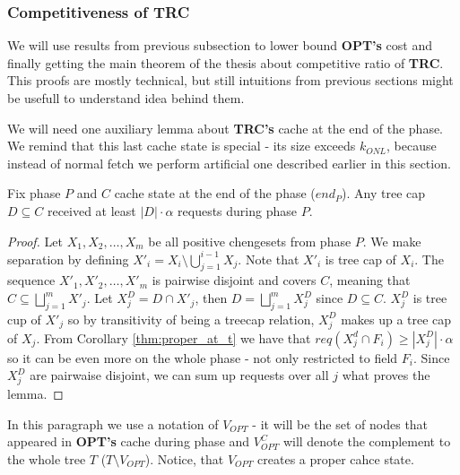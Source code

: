 \subsubsection{Competitiveness of TRC}
We will use results from previous subsection to lower bound \textbf{OPT's} cost 
and finally getting the main theorem of the thesis about competitive ratio of 
\textbf{TRC}. This proofs are mostly technical, but still intuitions from 
previous sections might be usefull to understand idea behind them.

We will need one auxiliary lemma about \textbf{TRC's} cache at the end of the 
phase. We remind that this last cache state is special - its size exceeds 
$k_{ONL}$, because instead of normal fetch we perform artificial one 
described earlier in this section.  
\begin{lemma}
Fix phase $P$ and $C$ cache state at the end of the phase ($end_P$). Any tree 
cap $D \subseteq C$ received at least $|D| \cdot \alpha$ requests during phase 
$P$.
\label{thm:lots_of_req_in_tc_end_of_p}
\end{lemma}
\begin{proof}
Let $X_1, X_2, \ldots, X_m$ be all positive chengesets from phase $P$. We make 
separation by defining $X'_i = X_i \setminus \bigcup_{j=1}^{i-1} X_j$. Note 
that $X'_i$ is tree cap of $X_i$. The sequence $X'_1, X'_2, \ldots, X'_m$ is 
pairwise disjoint and covers $C$, meaning that $C \subseteq \bigsqcup_{j=1}^m 
X'_j$. Let $X_j^D = D \cap X'_j$, then $D = \bigsqcup_{j=1}^m X_j^D$ since $D 
\subseteq C$. $X_j^D$ is tree cup of $X'_j$ so by transitivity of 
being a treecap relation, $X_j^D$ makes up a tree cap of $X_j$. From Corollary 
\ref{thm:proper_at_t} we have that $req(X_j^d \cap F_i) \geq |X_j^D| \cdot 
\alpha$ so it can be even more on the whole phase - not only restricted to 
field $F_i$. Since $X_j^D$ are pairwaise disjoint, we can sum up requests over 
all $j$ what proves the lemma.
\end{proof}

In this paragraph we use a notation of $V_{OPT}$ - it will be the set of nodes 
that appeared in \textbf{OPT's} cache during phase and $V_{OPT}^C$ will 
denote the complement to the whole tree $T$ ($T \setminus V_{OPT}$). Notice, 
that $V_{OPT}$ creates a proper cahce state.

